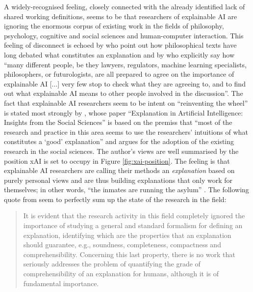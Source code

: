 A widely-recognised feeling, closely connected with the already identified lack of shared working definitions, seems to be that researchers of explainable AI are ignoring the enormous corpus of existing work in the fields of philosophy, psychology, cognitive and social sciences and human-computer interaction.
This feeling of disconnect is echoed by \citet{gilpin2018explaining} who point out how philosophical texts have long debated what constitutes an explanation and by \citet{mittelstadt2019explaining} who explicitly say how \enquote{many different people, be they lawyers, regulators, machine learning specialists, philosophers, or futurologists, are all prepared to agree on the importance of explainable AI [...] very few stop to check what they are agreeing to, and to find out what explainable AI means to other people involved in the discussion}.
The fact that explainable AI researchers seem to be intent on \enquote{reinventing the wheel} is stated most strongly by \citet{miller2018explanation}, whose paper \enquote{Explanation in Artificial Intelligence: Insights from the Social Sciences} is based on the premiss that \enquote{most of the research and practice in this area seems to use the researchers' intuitions of what constitutes a `good' explanation} and argues for the adoption of the existing research in the social sciences.
The author's views are well summarised by the position xAI is set to occupy in Figure \ref{fig:xai-position}.
The feeling is that explainable AI researchers are calling their methods an \textit{explanation} based on purely personal views and are thus building explanations that only work for themselves; in other words, \enquote{the inmates are running the asylum} \citep{Miller2017}.
The following quote from \citet{guidotti2018survey} seem to perfectly sum up the state of the research in the field: 
\begin{quotation}
	It is evident that the research activity in this field completely ignored the importance of studying a general and standard formalism for defining an explanation, identifying which are the properties that an explanation should guarantee, e.g., soundness, completeness, compactness and comprehensibility. Concerning this last property, there is no work that seriously addresses the problem of quantifying the grade of comprehensibility of an explanation for humans, although it is of fundamental importance. 
	
	\hfill \citep[pag. 37]{guidotti2018survey}
\end{quotation}

